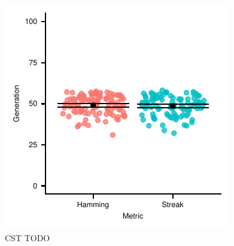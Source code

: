 \begin{figure}
\centering
\includegraphics[width=\linewidth]{img/gp_results/panel-cst-times.pdf}%
\caption{
 CST TODO
 }
\label{fig:cst-times}
\end{figure}
